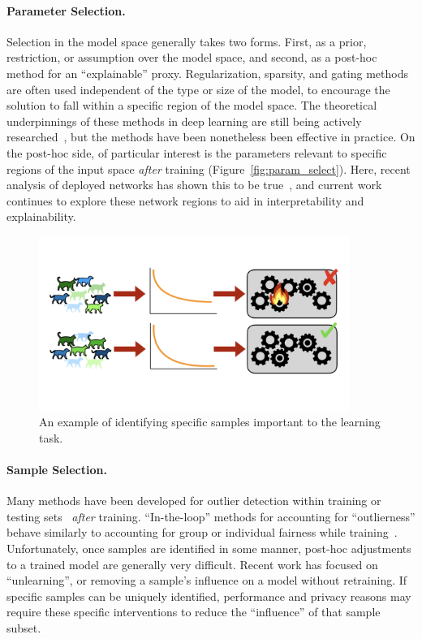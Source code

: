 \paragraph{Parameter Selection.} 
Selection in the model space generally takes two forms. First, as a prior, restriction, or assumption over the model space, and second, as a post-hoc method for an ``explainable'' proxy.
Regularization, sparsity, and gating methods are often used independent of the type or size of the model, to encourage the solution to fall within a specific region of the model space.
The theoretical underpinnings of these methods in deep learning are still being actively researched~\citep{hardt2016train,jacot2018neural,neyshabur2014search}, but the methods have been nonetheless been effective in practice. 
On the post-hoc side, of particular interest is the parameters relevant to specific regions of the input space \textit{after} training (Figure~\ref{fig:param_select}). Here, recent analysis of deployed networks has shown this to be true~\citep{bau2017network,fong2018net2vec}, and current work continues to explore these network regions to aid in interpretability and explainability.

\begin{figure}
    \centering
    \includegraphics[trim={0 4.5cm 0 4cm},clip,width=0.9\textwidth]{diss/1_intro/figs/sample_select.png}
    \caption[Visualization of sample selection]{An example of identifying specific samples important to the learning task.}
    \label{fig:sample_select}
\end{figure}
\paragraph{Sample Selection.} Many methods have been developed for outlier detection within training or testing sets~\citep{huang2020feature,ren2019likelihood} \textit{after} training. ``In-the-loop'' methods for accounting for ``outlierness'' behave similarly to accounting for group or individual fairness while training~\cite{mehrabi2021survey}. Unfortunately, once samples are identified in some manner, post-hoc adjustments to a trained model are generally very difficult. Recent work has focused on ``unlearning'', or removing a sample's influence on a model without retraining. If specific samples can be uniquely identified, performance and privacy reasons may require these specific interventions to reduce the ``influence'' of that sample subset.

